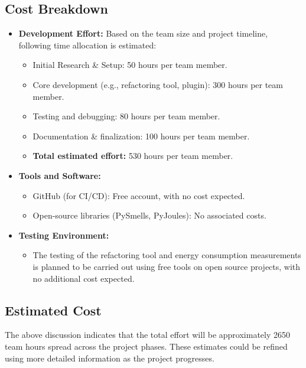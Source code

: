 \documentclass[12pt]{article}
\begin{document}
\subsection{Cost Breakdown}
\begin{itemize}
    \item \textbf{Development Effort:} Based on the team size and project timeline, following time allocation is estimated:
        \begin{itemize}
            \item Initial Research \& Setup: 50 hours per team member.
            \item Core development (e.g., refactoring tool, plugin): 300 hours per team member.
            \item Testing and debugging: 80 hours per team member.
            \item Documentation \& finalization: 100 hours per team member.
            \item \textbf{Total estimated effort:} 530 hours per team member.
        \end{itemize}

    \item \textbf{Tools and Software:}
    \begin{itemize}
        \item GitHub (for CI/CD): Free account, with no cost expected.
        \item Open-source libraries (PySmells, PyJoules): No associated costs.
    \end{itemize}

    \item \textbf{Testing Environment:}
    \begin{itemize}
        \item The testing of the refactoring tool and energy consumption measurements is planned to be carried out using free tools on open source projects, with no additional cost expected.
    \end{itemize}

\end{itemize}

\subsection{Estimated Cost}
The above discussion indicates that the total effort will be approximately 2650 team hours spread across the project phases. These estimates could be refined using more detailed information as the project progresses.
\end{document}
